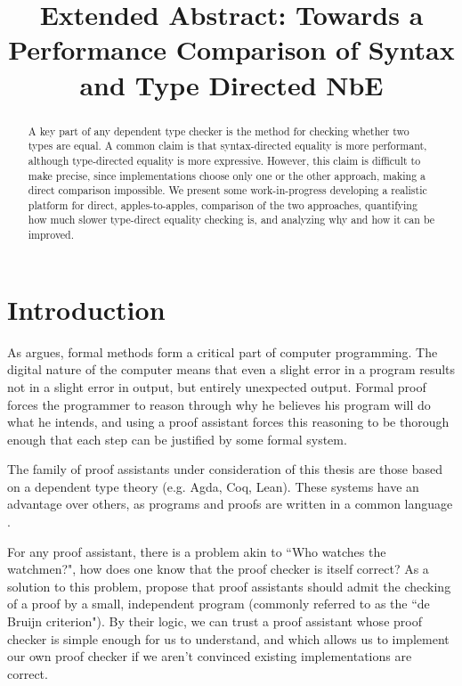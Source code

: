 \documentclass[sigplan,nonacm]{acmart}
\title{Extended Abstract: Towards a Performance Comparison of Syntax and Type Directed NbE}
\begin{document}
\begin{abstract}
A key part of any dependent type checker is the method for checking whether two types are equal.
A common claim is that syntax-directed equality is more performant, although type-directed equality is more expressive.
However, this claim is difficult to make precise, since implementations choose only one or the other approach, making a direct comparison impossible.
We present some work-in-progress developing a realistic platform for direct, apples-to-apples, comparison of the two approaches, quantifying how much slower type-direct equality checking is, and analyzing why and how it can be improved.
\end{abstract}

\maketitle

\section{Introduction}

As \citet{Dijkstra1988} argues, formal methods form a critical part of computer programming.
The digital nature of the computer means that even a slight error in a program results not in a slight error in output, but entirely unexpected output.
Formal proof forces the programmer to reason through why he believes his program will do what he intends, and using a proof assistant forces this reasoning to be thorough enough that each step can be justified by some formal system.

The family of proof assistants under consideration of this thesis are those based on a dependent type theory (e.g. Agda, Coq, Lean).
These systems have an advantage over others, as programs and proofs are written in a common language \citep{Nordstrom1990}.

For any proof assistant, there is a problem akin to ``Who watches the watchmen?", how does one know that the proof checker is itself correct?
As a solution to this problem, \citet{Barendregt2005} propose that proof assistants should admit the checking of a proof by a small, independent program (commonly referred to as the ``de Bruijn criterion").
By their logic, we can trust a proof assistant whose proof checker is simple enough for us to understand, and which allows us to implement our own proof checker if we aren't convinced existing implementations are correct.
\end{document}
